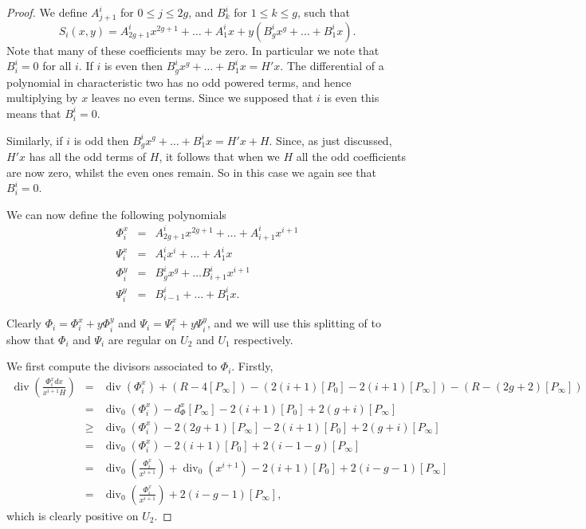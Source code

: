 \documentclass[draft, 11pt]{article} %
\theoremstyle{plain}
\theoremstyle{remark}
\DeclareMathOperator{\di}{div}
\begin{document}
\begin{proof}
We define $A^i_{j+1}$ for $0 \leq j \leq 2g$, and $B_k^i$ for $1\leq k \leq g$, such that
\[
S_i(x,y) = A_{2g+1}^ix^{2g+1} + \ldots + A^i_1 x + y(B_g^i x^g + \ldots + B_1^i x).
\]
Note that many of these coefficients may be zero.
In particular we note that $B_i^i = 0$ for all $i$.
If $i$ is even then $B_g^ix^g + \ldots + B_1^ix = H'x$.
The differential of a polynomial in characteristic two has no odd powered terms, and hence multiplying by $x$ leaves no even terms.
Since we supposed that $i$ is even this means that $B_i^i = 0$.

Similarly, if $i$ is odd then $B_g^ix^g + \ldots + B_1^ix = H'x + H$.
Since, as just discussed, $H'x$ has all the odd terms of $H$, it follows that when we $H$ all the odd coefficients are now zero, whilst the even ones remain.
So in this case we again see that $B_i^i = 0$.



We can now define the following polynomials
\begin{eqnarray*}
\Phi_i^x & = & A^i_{2g+1}x^{2g+1} + \ldots + A^i_{i+1}x^{i+1} \\
\Psi_i^x & = & A^i_ix^i + \ldots + A^i_1x \\
\Phi_i^y & = & B_g^ix^g + \ldots B_{i+1}^ix^{i+1} \\
\Psi_i^y & = & B_{i-1}^i + \ldots + B_1^ix.
\end{eqnarray*}


Clearly $\Phi_i = \Phi_i^x + y\Phi_i^y$ and $\Psi_i = \Psi_i^x + y\Psi_i^y$, and we will use this splitting of to show that $\Phi_i$ and $\Psi_i$ are regular on $U_2$ and $U_1$ respectively.

We first compute the divisors associated to $\Phi_i$.
Firstly,
\begin{eqnarray*}
\di \left( \frac{\Phi_i^x dx}{x^{i+1} H} \right) & = & \di(\Phi_i^x) + (R - 4[P_\infty]) - (2(i+1)[P_0] - 2(i+1)[P_\infty]) - (R - (2g+2) [P_\infty]) \\
& = & \di_0(\Phi_i^x) -d_\Phi^x[P_\infty] -2(i+1)[P_0] + 2(g+i)[P_\infty]\\
& \geq & \di_0(\Phi_i^x) - 2(2g+1)[P_\infty] - 2(i+1)[P_0] + 2(g+i)[P_\infty] \\
& = & \di_0(\Phi_i^x) - 2(i+1)[P_0] + 2(i-1-g)[P_\infty] \\
& = & \di_0\left( \frac{\Phi_i^x}{x^{i+1}} \right) + \di_0( x^{i+1}) - 2(i+1)[P_0] + 2(i-g-1)[P_\infty] \\
& = & \di_0 \left( \frac{\Phi_i^x}{x^{i+1}} \right) + 2(i-g-1)[P_\infty],
\end{eqnarray*}
which is clearly positive on $U_2$.


\end{proof}
\end{document}

